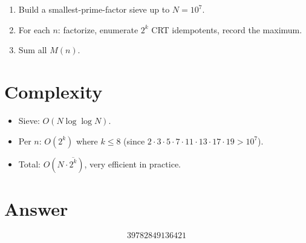 \documentclass[11pt]{article}
\theoremstyle{definition}
\begin{document}
\begin{enumerate}
  \item Build a smallest-prime-factor sieve up to $N = 10^7$.
  \item For each $n$: factorize, enumerate $2^k$ CRT idempotents, record the maximum.
  \item Sum all $M(n)$.
\end{enumerate}

\section{Complexity}

\begin{itemize}
  \item Sieve: $O(N \log \log N)$.
  \item Per $n$: $O(2^k)$ where $k \le 8$ (since $2 \cdot 3 \cdot 5 \cdot 7 \cdot 11 \cdot 13 \cdot 17 \cdot 19 > 10^7$).
  \item Total: $O(N \cdot \overline{2^k})$, very efficient in practice.
\end{itemize}

\section{Answer}

\[
\boxed{39782849136421}
\]
\end{document}
